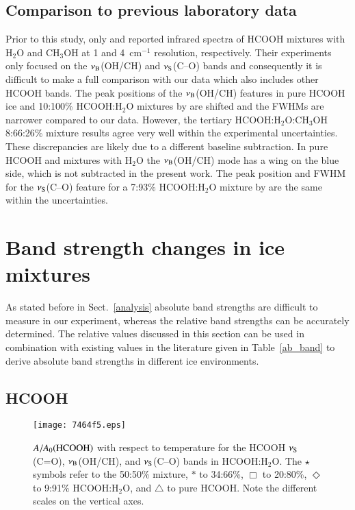 \documentclass{aa}
\begin{document}
\subsection{Comparison to previous laboratory data}
\label{prev-lab}

Prior to this study, only \citet{schutte1999} and \citet{hudson1999}
reported infrared spectra of HCOOH mixtures with H$_2$O and CH$_3$OH
at 1 and 4~cm$^{-1}$ resolution, respectively. Their experiments only
focused on the $\nu_{\rm B}$(OH/CH) and $\nu_{\rm S}$(C--O) bands and
consequently it is difficult to make a full comparison with our data
which also includes other HCOOH bands. The peak positions of the
$\nu_{\rm B}$(OH/CH) features in pure HCOOH ice and 10:100\%
HCOOH:H$_2$O mixtures by \citet{schutte1999} are shifted and the FWHMs
are narrower compared to our data. However, the tertiary
HCOOH:H$_2$O:CH$_3$OH 8:66:26\% mixture results agree very well within
the experimental uncertainties. These discrepancies are likely due to
a different baseline subtraction. In pure HCOOH and mixtures with
H$_2$O the $\nu_{\rm B}$(OH/CH) mode has a wing on the blue side,
which is not subtracted in the present work. The peak position and
FWHM for the $\nu_{\rm S}$(C--O) feature for a 7:93\% HCOOH:H$_2$O
mixture by \citet{hudson1999} are the same within the uncertainties.

\section{Band strength changes in ice mixtures}
\label{bandstrength}

As stated before in Sect.~\ref{analysis} absolute band strengths are
difficult to measure in our experiment, whereas the relative band
strengths can be accurately determined. The relative values discussed
in this section can be used in combination with existing values in the
literature given in Table~\ref{ab_band} to derive absolute band
strengths in different ice environments.

\subsection{HCOOH}

\begin{figure}
\centering
\texttt{[image: 7464f5.eps]}
\caption{$A/A_0{\rm ( HCOOH)}$ with respect to temperature for the
  HCOOH $\nu_{\rm S}$(C=O), $\nu_{\rm B}$(OH/CH), and $\nu_{\rm
    S}$(C--O) bands in HCOOH:H$_2$O. The $\star$ symbols refer to the
  50:50\% mixture, $\ast$ to 34:66\%, $\Box$ to 20:80\%, $\Diamond$ to
  9:91\% HCOOH:H$_2$O, and $\bigtriangleup$ to pure HCOOH. Note the
  different scales on the vertical axes.}
\label{int_comp}
\end{figure}
\end{document}
